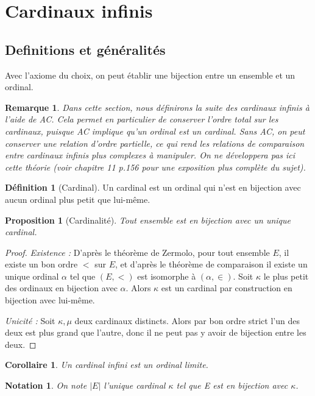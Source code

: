 \documentclass{article}
\theoremstyle{definition}
\newtheorem{definition}[subsubsection]{Définition}
\theoremstyle{plain}
\newtheorem{proposition}[subsubsection]{Proposition}
\theoremstyle{plain}
\newtheorem{corollary}[subsubsection]{Corollaire}
\theoremstyle{plain}
\theoremstyle{plain}
\newtheorem{remark}[subsubsection]{Remarque}
\theoremstyle{plain}
\newtheorem*{notation}{Notation}
\begin{document}
\clearpage
\section{Cardinaux infinis}
\subsection{Definitions et généralités}

\par Avec l'axiome du choix, on peut établir une bijection entre un ensemble et un ordinal.

\begin{remark}
	Dans cette section, nous définirons la suite des cardinaux infinis à l'aide de AC. Cela permet en particulier de conserver l'ordre total sur les cardinaux, puisque AC implique qu'un ordinal est un cardinal. Sans AC, on peut conserver une relation d'ordre partielle, ce qui rend les relations de comparaison entre cardinaux infinis plus complexes à manipuler. On ne développera pas ici cette théorie (voir \cite{jech1973axiom} chapitre 11 p.156 pour une exposition plus complète du sujet).
\end{remark}

\begin{definition}[Cardinal]
	Un cardinal est un ordinal qui n'est en bijection avec aucun ordinal plus petit que lui-même.
\end{definition}

\begin{proposition}[Cardinalité]
	Tout ensemble est en bijection avec un unique cardinal.
\end{proposition}
\begin{proof}	
	\textit{Existence :} D'après le théorème de Zermolo, pour tout ensemble \( E \), il existe un bon ordre \( < \) sur \( E \), et d'après le théorème de comparaison il existe un unique ordinal \( \alpha \) tel que \( (E,<) \) est isomorphe à \( (\alpha,\in) \). Soit \( \kappa \) le plus petit des ordinaux en bijection avec \( \alpha \). Alors \( \kappa \) est un cardinal par construction en bijection avec lui-même. 

	\textit{Unicité : } Soit \( \kappa, \mu \) deux cardinaux distincts. Alors par bon ordre strict l'un des deux est plus grand que l'autre, donc il ne peut pas y avoir de bijection entre les deux.
\end{proof}

\begin{corollary}
	Un cardinal infini est un ordinal limite.
\end{corollary}
\begin{notation}
	On note \( |E| \) l'unique cardinal \( \kappa \) tel que E est en bijection avec \( \kappa \).
\end{notation}
\end{document}

